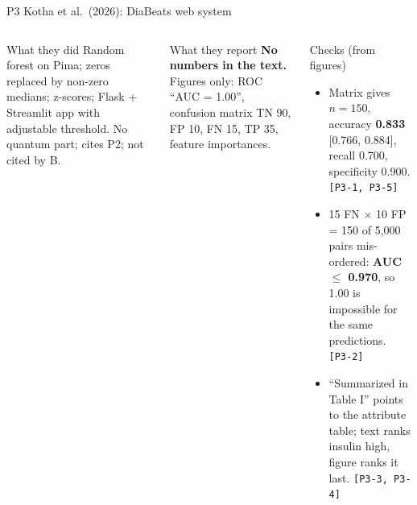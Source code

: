 \documentclass[aspectratio=169,10pt,t,xcolor={table}]{beamer}
\begin{document}
\begin{frame}{P3 \quad Kotha et al.\ (2026): DiaBeats web system}
\begin{columns}[T]
\begin{block}{What they did}
\footnotesize
Random forest on Pima; zeros replaced by non-zero medians; z-scores; Flask + Streamlit app with adjustable threshold. No quantum part; cites P2; not cited by B.
\end{block}
\begin{block}{What they report}
\footnotesize
\textbf{No numbers in the text.} Figures only: ROC ``AUC = 1.00'', confusion matrix TN 90, FP 10, FN 15, TP 35, feature importances.
\end{block}
\begin{alertblock}{Checks (from figures)}
\footnotesize
\begin{itemize}
  \item Matrix gives $n=150$, accuracy \textbf{0.833} [0.766, 0.884], recall 0.700, specificity 0.900. \texttt{[P3-1, P3-5]}
  \item 15 FN $\times$ 10 FP = 150 of 5,000 pairs mis-ordered: \textbf{AUC $\le$ 0.970}, so 1.00 is impossible for the same predictions. \texttt{[P3-2]}
  \item ``Summarized in Table I'' points to the attribute table; text ranks insulin high, figure ranks it last. \texttt{[P3-3, P3-4]}
\end{itemize}
\end{alertblock}
\end{columns}
\end{frame}
\end{document}
